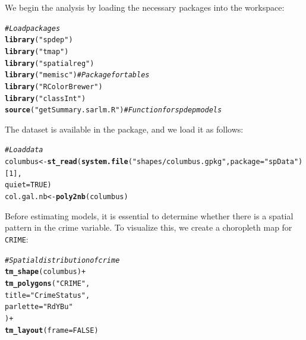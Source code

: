 \documentclass[english,12pt]{book}\usepackage[]{graphicx}\usepackage[]{xcolor}
\makeatletter
\newcommand{\hlnum}[1]{\textcolor[rgb]{0.686,0.059,0.569}{#1}}%
\newcommand{\hlsng}[1]{\textcolor[rgb]{0.192,0.494,0.8}{#1}}%
\newcommand{\hlcom}[1]{\textcolor[rgb]{0.678,0.584,0.686}{\textit{#1}}}%
\newcommand{\hlopt}[1]{\textcolor[rgb]{0,0,0}{#1}}%
\newcommand{\hldef}[1]{\textcolor[rgb]{0.345,0.345,0.345}{#1}}%
\newcommand{\hlkwb}[1]{\textcolor[rgb]{0.69,0.353,0.396}{#1}}%
\newcommand{\hlkwc}[1]{\textcolor[rgb]{0.333,0.667,0.333}{#1}}%
\newcommand{\hlkwd}[1]{\textcolor[rgb]{0.737,0.353,0.396}{\textbf{#1}}}%
\newenvironment{kframe}{%
 \def\at@end@of@kframe{}%
 \ifinner\ifhmode%
  \def\at@end@of@kframe{\end{minipage}}%
  \begin{minipage}{\columnwidth}%
 \fi\fi%
 \def\FrameCommand##1{\hskip\@totalleftmargin \hskip-\fboxsep
 \colorbox{shadecolor}{##1}\hskip-\fboxsep
     \hskip-\linewidth \hskip-\@totalleftmargin \hskip\columnwidth}%
 \MakeFramed {\advance\hsize-\width
   \@totalleftmargin\z@ \linewidth\hsize
   \@setminipage}}%
 {\par\unskip\endMakeFramed%
 \at@end@of@kframe}
\newenvironment{knitrout}{}{} %
\makeatother
\begin{document}
We begin the analysis by loading the necessary  packages into the workspace:

\begin{knitrout}
\color{fgcolor}\begin{kframe}
\begin{alltt}
\hlcom{# Load packages}
\hlkwd{library}\hldef{(}\hlsng{"spdep"}\hldef{)}
\hlkwd{library}\hldef{(}\hlsng{"tmap"}\hldef{)}
\hlkwd{library}\hldef{(}\hlsng{"spatialreg"}\hldef{)}
\hlkwd{library}\hldef{(}\hlsng{"memisc"}\hldef{)}            \hlcom{# Package for tables}
\hlkwd{library}\hldef{(}\hlsng{"RColorBrewer"}\hldef{)}
\hlkwd{library}\hldef{(}\hlsng{"classInt"}\hldef{)}
\hlkwd{source}\hldef{(}\hlsng{"getSummary.sarlm.R"}\hldef{)} \hlcom{# Function for spdep models}
\end{alltt}
\end{kframe}
\end{knitrout}

The dataset is available in the  package, and we load it as follows:

\begin{knitrout}
\color{fgcolor}\begin{kframe}
\begin{alltt}
\hlcom{# Load data}
\hldef{columbus} \hlkwb{<-} \hlkwd{st_read}\hldef{(}\hlkwd{system.file}\hldef{(}\hlsng{"shapes/columbus.gpkg"}\hldef{,} \hlkwc{package}\hldef{=}\hlsng{"spData"}\hldef{)[}\hlnum{1}\hldef{],}
                           \hlkwc{quiet} \hldef{=} \hlnum{TRUE}\hldef{)}
\hldef{col.gal.nb} \hlkwb{<-} \hlkwd{poly2nb}\hldef{(columbus)}
\end{alltt}
\end{kframe}
\end{knitrout}

Before estimating models, it is essential to determine whether there is a spatial pattern in the crime variable. To visualize this, we create a choropleth map for \texttt{CRIME}:

\begin{knitrout}
\color{fgcolor}\begin{kframe}
\begin{alltt}
\hlcom{# Spatial distribution of crime}
\hlkwd{tm_shape}\hldef{(columbus)} \hlopt{+}
  \hlkwd{tm_polygons}\hldef{(}\hlsng{"CRIME"}\hldef{,}
              \hlkwc{title} \hldef{=} \hlsng{"Crime Status"}\hldef{,}
              \hlkwc{parlette} \hldef{=} \hlsng{"RdYBu"}
              \hldef{)} \hlopt{+}
  \hlkwd{tm_layout}\hldef{(}\hlkwc{frame} \hldef{=} \hlnum{FALSE}\hldef{)}
\end{alltt}
\end{kframe}
\end{knitrout}
\end{document}
